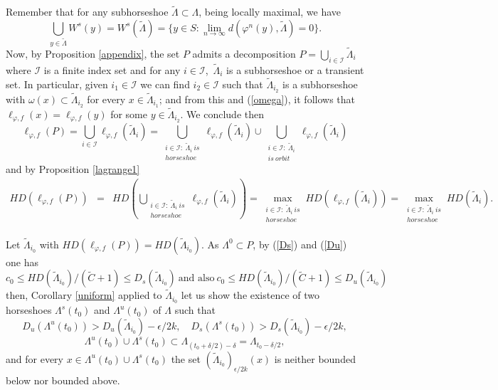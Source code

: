 \documentclass[12pt]{amsart}
\theoremstyle{plain} %
\theoremstyle{definition} %
\numberwithin{equation}{section}
\begin{document}
Remember that for any subhorseshoe $\tilde{\Lambda} \subset \Lambda$, being locally maximal, we have 
\begin{equation}\label{omega}
 \bigcup \limits_{y\in \tilde{\Lambda}}W^s(y)=W^s(\tilde{\Lambda})= \{y\in S: \lim \limits_{n \to \infty}d(\varphi^n(y),\tilde{\Lambda})=0\}.   
\end{equation}
Now, by Proposition \ref{appendix}, the set $P$ admits a decomposition $P=\bigcup \limits_{i\in \mathcal{I}} \tilde{\Lambda}_i$ where $\mathcal{I}$ is a finite index set and for any $i\in \mathcal{I}$,\ $\tilde{\Lambda}_i$ is a subhorseshoe or a transient set. In particular, given $i_1\in \mathcal{I}$ we can find $i_2\in \mathcal{I}$ such that $\tilde{\Lambda}_{i_2}$ is a subhorseshoe with $\omega(x)\subset \tilde{\Lambda}_{i_2}$ for every $x\in\tilde{\Lambda}_{i_1}$; and from this and (\ref{omega}), it follows that $\ell_{\varphi,f}(x)=\ell_{\varphi,f}(y)$ for some $y\in\tilde{\Lambda}_{i_2}$. We conclude then 
$$\ell_{\varphi,f}(P)=\bigcup \limits_{i\in \mathcal{I}} \ell_{\varphi,f}(\tilde{\Lambda}_i)=\bigcup \limits_{\substack{i\in \mathcal{I}: \ \tilde{\Lambda}_i \ is\\ horseshoe }} \ell_{\varphi,f}(\tilde{\Lambda}_i) \cup \bigcup \limits_{\substack{i\in \mathcal{I}: \ \tilde{\Lambda}_i\\ is \ orbit }} \ell_{\varphi,f}(\tilde{\Lambda}_i)$$ and by Proposition \ref{lagrange1}
\begin{eqnarray*}
HD(\ell_{\varphi,f}(P))&=&HD( \bigcup \limits_{\substack{i\in \mathcal{I}: \ \tilde{\Lambda}_i \ is\\ horseshoe }} \ell_{\varphi,f}(\tilde{\Lambda}_i))=\max \limits_{\substack{i\in \mathcal{I}: \ \tilde{\Lambda}_i \ is\\ horseshoe }} HD(\ell_{\varphi,f}(\tilde{\Lambda}_i))=\max \limits_{\substack{i\in \mathcal{I}: \ \tilde{\Lambda}_i \ is\\ horseshoe }} HD(\tilde{\Lambda}_i).
\end{eqnarray*}

Let $\tilde{\Lambda}_{i_0}$ with $HD(\ell_{\varphi,f}(P))=HD(\tilde{\Lambda}_{i_0})$. As $\Lambda^0 \subset P$, by (\ref{Ds}) and (\ref{Du}) one has
$$c_0\leq HD(\tilde{\Lambda}_{i_0})/(\tilde{C}+1)\leq D_s(\tilde{\Lambda}_{i_0}) \ \mbox{and also}\ c_0\leq HD(\tilde{\Lambda}_{i_0})/(\tilde{C}+1)\leq D_u(\tilde{\Lambda}_{i_0})$$
then, Corollary \ref{uniform} applied to $\tilde{\Lambda}_{i_0}$ let us show the existence of two horseshoes $\Lambda ^s(t_0)$ and  $\Lambda ^u(t_0)$ of $\Lambda$ such that
$$D_u(\Lambda ^u(t_0))>D_u(\tilde{\Lambda}_{i_0})-\epsilon/2k, \quad D_s(\Lambda ^s(t_0))>D_s(\tilde{\Lambda}_{i_0})-\epsilon/2k,$$
$$\Lambda ^u(t_0)\cup \Lambda ^s(t_0) \subset \Lambda_{(t_0+\delta/2)-\delta}=\Lambda_{t_0-\delta/2},$$ 
and for every $x\in \Lambda ^u(t_0) \cup \Lambda ^s(t_0)$ the set $(\tilde{\Lambda}_{i_0})_{\epsilon/2k}(x)$ is neither bounded below nor bounded above.
\end{document}
